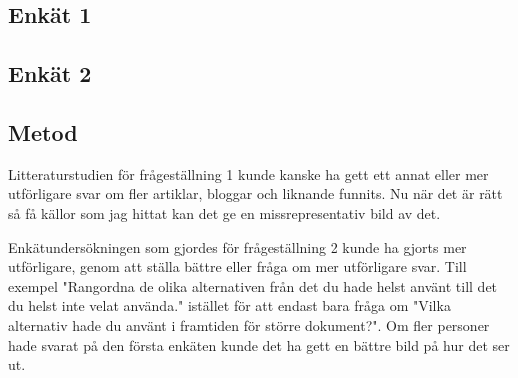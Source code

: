 \subsection{Enkät 1}

\subsection{Enkät 2}

\subsection{Metod}
Litteraturstudien för frågeställning 1 kunde kanske ha gett ett annat eller mer utförligare svar om fler artiklar, bloggar och liknande funnits. Nu när det är rätt så få källor som jag hittat kan det ge en missrepresentativ bild av det.

Enkätundersökningen som gjordes för frågeställning 2 kunde ha gjorts mer utförligare, genom att ställa bättre eller fråga om mer utförligare svar. Till exempel "Rangordna de olika alternativen från det du hade helst använt till det du helst inte velat använda." istället för att endast bara fråga om "Vilka alternativ hade du använt i framtiden för större dokument?". Om fler personer hade svarat på den första enkäten kunde det ha gett en bättre bild på hur det ser ut.





